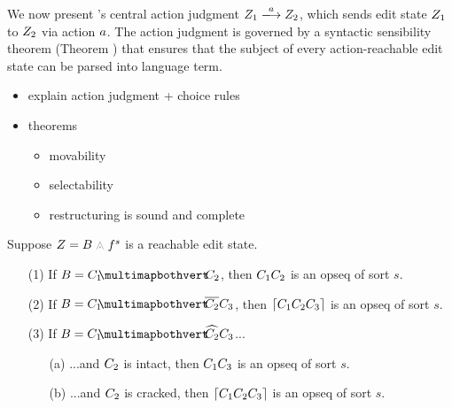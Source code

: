 
We now present \ty's central action judgment
$\performAction{\editState_1}{\action}{\editState_2}$,
which sends edit state $Z_1$ to $Z_2$
via action $a$.
The action judgment is governed by a syntactic sensibility
theorem (Theorem ) that ensures that
the subject of every action-reachable edit state can
be parsed into language term.

% 













\begin{itemize}
  \item explain action judgment + choice rules
  \item theorems
  \begin{itemize}
    \item movability
    \item selectability
    \item restructuring is sound and complete
  \end{itemize}
\end{itemize}

\begin{theorem}
  Suppose $Z = \zipper{\subject}{\tfrelem^s}$ is a reachable edit state.
  \begin{enumerate}
  \item[(1)] If $\subject = \pointing{\selection_1}{\selection_2}$,
    then $C_1C_2$ is an opseq of sort $s$.
  \item[(2)] If $\subject = \selecting{\selection_1}{\selection_2}{\selection_3}$,
    then $\left\lceil C_1C_2C_3\right\rceil$ is an opseq of sort $s$.
  \item[(3)] If $\subject = \restructuring{\selection_1}{\selection_2}{\selection_3}$...
    \begin{enumerate}
      \item[(a)] ...and $C_2$ is intact, then
        $C_1C_3$ is an opseq of sort $s$.
      \item[(b)] ...and $C_2$ is cracked, then
        $\left\lceil C_1C_2C_3\right\rceil$ is an opseq of sort $s$.
    \end{enumerate}
  \end{enumerate}
\end{theorem}


